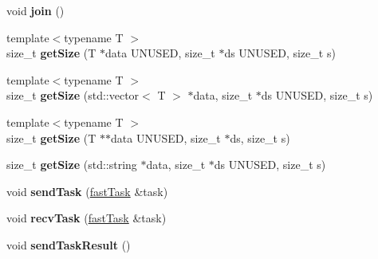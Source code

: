 \begin{DoxyCompactItemize}
\item 
\hypertarget{classfaster_1_1fastComm_aa950bd0e9b0762a4c22849b8cc147bfd}{}void {\bfseries join} ()\label{classfaster_1_1fastComm_aa950bd0e9b0762a4c22849b8cc147bfd}

\item 
\hypertarget{classfaster_1_1fastComm_a44921f3579aef32a44b2885036cac5d4}{}{\footnotesize template$<$typename T $>$ }\\size\+\_\+t {\bfseries get\+Size} (T $\ast$data U\+N\+U\+S\+E\+D, size\+\_\+t $\ast$ds U\+N\+U\+S\+E\+D, size\+\_\+t s)\label{classfaster_1_1fastComm_a44921f3579aef32a44b2885036cac5d4}

\item 
\hypertarget{classfaster_1_1fastComm_ac71b4eb43829701d26467fb989a23a83}{}{\footnotesize template$<$typename T $>$ }\\size\+\_\+t {\bfseries get\+Size} (std\+::vector$<$ T $>$ $\ast$data, size\+\_\+t $\ast$ds U\+N\+U\+S\+E\+D, size\+\_\+t s)\label{classfaster_1_1fastComm_ac71b4eb43829701d26467fb989a23a83}

\item 
\hypertarget{classfaster_1_1fastComm_acd70265fc24a6ae9c7f9bced7a26c00c}{}{\footnotesize template$<$typename T $>$ }\\size\+\_\+t {\bfseries get\+Size} (T $\ast$$\ast$data U\+N\+U\+S\+E\+D, size\+\_\+t $\ast$ds, size\+\_\+t s)\label{classfaster_1_1fastComm_acd70265fc24a6ae9c7f9bced7a26c00c}

\item 
\hypertarget{classfaster_1_1fastComm_a9244e6467e1882c63669457da4514de9}{}size\+\_\+t {\bfseries get\+Size} (std\+::string $\ast$data, size\+\_\+t $\ast$ds U\+N\+U\+S\+E\+D, size\+\_\+t s)\label{classfaster_1_1fastComm_a9244e6467e1882c63669457da4514de9}

\item 
\hypertarget{classfaster_1_1fastComm_a5d58904aab5cc5517df322ab075d64a6}{}void {\bfseries send\+Task} (\hyperlink{classfaster_1_1fastTask}{fast\+Task} \&task)\label{classfaster_1_1fastComm_a5d58904aab5cc5517df322ab075d64a6}

\item 
\hypertarget{classfaster_1_1fastComm_a21bec386fa7d88f3c74345f63d76112a}{}void {\bfseries recv\+Task} (\hyperlink{classfaster_1_1fastTask}{fast\+Task} \&task)\label{classfaster_1_1fastComm_a21bec386fa7d88f3c74345f63d76112a}

\item 
\hypertarget{classfaster_1_1fastComm_afa35823e5ba267525e6cccbf0732c4b5}{}void {\bfseries send\+Task\+Result} ()\label{classfaster_1_1fastComm_afa35823e5ba267525e6cccbf0732c4b5}


\end{DoxyCompactItemize}
